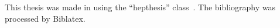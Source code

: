 \begin{colophon}
  This thesis was made in \LaTeXe{} using the ``hepthesis'' class~\cite{hepthesis}. The bibliography was processed by Biblatex.
\end{colophon}

% 



\listoffigures
\listoftables

